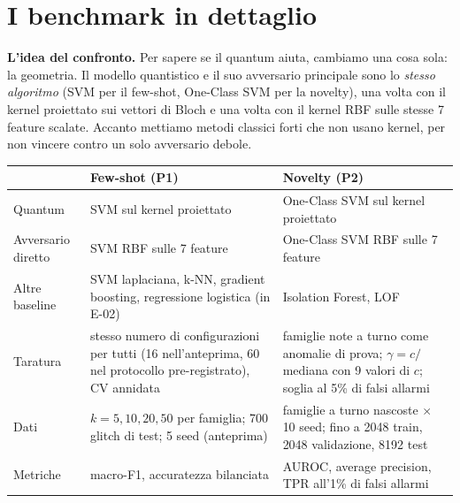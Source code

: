 \section{I benchmark in dettaglio}

\textbf{L’idea del confronto.} Per sapere se il quantum aiuta, cambiamo una cosa sola: la geometria. Il modello
quantistico e il suo avversario principale sono lo \emph{stesso algoritmo} (SVM per il few-shot, One-Class SVM per la
novelty), una volta con il kernel proiettato sui vettori di Bloch e una volta con il kernel RBF sulle stesse 7 feature
scalate. Accanto mettiamo metodi classici forti che non usano kernel, per non vincere contro un solo avversario debole.

\begin{center}\small
\begin{tabularx}{\textwidth}{@{}l>{\raggedright\arraybackslash}X>{\raggedright\arraybackslash}X@{}}
\toprule
& \textbf{Few-shot (P1)} & \textbf{Novelty (P2)}\\
\midrule
Quantum & SVM sul kernel proiettato & One-Class SVM sul kernel proiettato\\
Avversario diretto & SVM RBF sulle 7 feature & One-Class SVM RBF sulle 7 feature\\
Altre baseline & SVM laplaciana, k-NN, gradient boosting, regressione logistica (in E-02) & Isolation Forest, LOF\\
Taratura & stesso numero di configurazioni per tutti (16 nell’anteprima, 60 nel protocollo pre-registrato), CV annidata &
famiglie note a turno come anomalie di prova; $\gamma=c/$mediana con 9 valori di $c$; soglia al 5\% di falsi allarmi\\
Dati & $k=5,10,20,50$ per famiglia; 700 glitch di test; 5 seed (anteprima) & 8 famiglie a turno nascoste $\times$ 10 seed;
fino a 2048 train, 2048 validazione, 8192 test\\
Metriche & macro-F1, accuratezza bilanciata & AUROC, average precision, TPR all’1\% di falsi allarmi\\
\bottomrule
\end{tabularx}
\end{center}

